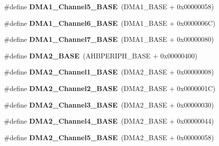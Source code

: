 \begin{DoxyCompactItemize}
\#define {\bfseries D\+M\+A1\+\_\+\+Channel5\+\_\+\+B\+A\+SE}~(D\+M\+A1\+\_\+\+B\+A\+SE + 0x00000058)
\item 
\mbox{\label{group___peripheral__memory__map_ga896c2c7585dd8bc3969cf8561f689d2d}} 
\#define {\bfseries D\+M\+A1\+\_\+\+Channel6\+\_\+\+B\+A\+SE}~(D\+M\+A1\+\_\+\+B\+A\+SE + 0x0000006\+C)
\item 
\mbox{\label{group___peripheral__memory__map_gaeee0d1f77d0db1db533016a09351166c}} 
\#define {\bfseries D\+M\+A1\+\_\+\+Channel7\+\_\+\+B\+A\+SE}~(D\+M\+A1\+\_\+\+B\+A\+SE + 0x00000080)
\item 
\mbox{\label{group___peripheral__memory__map_gab72a9ae145053ee13d1d491fb5c1df64}} 
\#define {\bfseries D\+M\+A2\+\_\+\+B\+A\+SE}~(A\+H\+B\+P\+E\+R\+I\+P\+H\+\_\+\+B\+A\+SE + 0x00000400)
\item 
\mbox{\label{group___peripheral__memory__map_gad3bd6c4201d12f5d474518c1b02f8e3b}} 
\#define {\bfseries D\+M\+A2\+\_\+\+Channel1\+\_\+\+B\+A\+SE}~(D\+M\+A2\+\_\+\+B\+A\+SE + 0x00000008)
\item 
\mbox{\label{group___peripheral__memory__map_ga22f39f23c879c699b88e04a629f69d1c}} 
\#define {\bfseries D\+M\+A2\+\_\+\+Channel2\+\_\+\+B\+A\+SE}~(D\+M\+A2\+\_\+\+B\+A\+SE + 0x0000001\+C)
\item 
\mbox{\label{group___peripheral__memory__map_ga6f2369b8bc155fb55a28891987605c2c}} 
\#define {\bfseries D\+M\+A2\+\_\+\+Channel3\+\_\+\+B\+A\+SE}~(D\+M\+A2\+\_\+\+B\+A\+SE + 0x00000030)
\item 
\mbox{\label{group___peripheral__memory__map_ga01b063266473f290a55047654fbbfbee}} 
\#define {\bfseries D\+M\+A2\+\_\+\+Channel4\+\_\+\+B\+A\+SE}~(D\+M\+A2\+\_\+\+B\+A\+SE + 0x00000044)
\item 
\mbox{\label{group___peripheral__memory__map_ga1eea983a5d68bf36f4d19fbb07955ca1}} 
\#define {\bfseries D\+M\+A2\+\_\+\+Channel5\+\_\+\+B\+A\+SE}~(D\+M\+A2\+\_\+\+B\+A\+SE + 0x00000058)

\end{DoxyCompactItemize}
